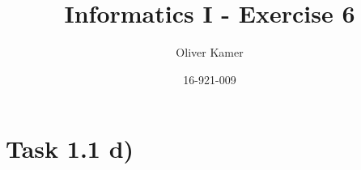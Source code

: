 \documentclass[11pt,a4paper]{article}
\author{Oliver Kamer}
\title{Informatics I - Exercise 6}
\date{16-921-009}
\begin{document}
	\maketitle
	
	\section*{Task 1.1 d)}
	
	
				
\end{document}
